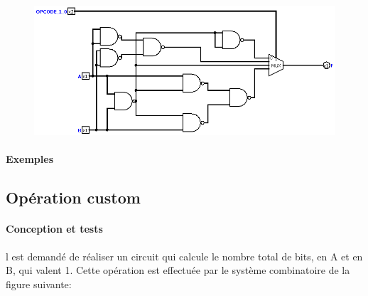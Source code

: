 \documentclass[a4paper]{article}
\begin{document}
\begin{tcolorbox}[colframe=Monokaimagenta,colback=white]
\begin{figure}[H]
    \centering
    \includegraphics[width=\textwidth]{src/LOGIC_1BIT.png}
    \label{fig:LOGIQUE_1BIT}
\end{figure}

\end{tcolorbox}



\paragraph{Exemples}


\subsection{Opération custom}
\label{custom}

\paragraph{Conception et tests}
l est demandé de réaliser un circuit qui calcule le nombre total de bits, en A et en B, qui valent 1. Cette opération est effectuée par le système combinatoire de la figure suivante:
\end{document}
